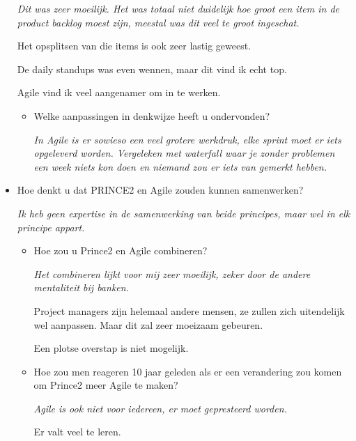 \documentclass[]{article}
\begin{document}
\begin{itemize}
	{\it 
		Dit was zeer moeilijk. Het was totaal niet duidelijk hoe groot een item in de product backlog moest zijn, meestal was dit veel te groot ingeschat.
		
		Het opsplitsen van die items is ook zeer lastig geweest.
		
		De daily standups was even wennen, maar dit vind ik echt top.
		
		Agile vind ik veel aangenamer om in te werken.
	}
	 
	\begin{itemize}
		\item Welke aanpassingen in denkwijze heeft u ondervonden?
		
		{\it 
			In Agile is er sowieso een veel grotere werkdruk, elke sprint moet er iets opgeleverd worden. Vergeleken met waterfall waar je zonder problemen een week niets kon doen en niemand zou er iets van gemerkt hebben.
		}
	\end{itemize}
	\item Hoe denkt u dat PRINCE2 en Agile zouden kunnen samenwerken?
	
	{\it 
		Ik heb geen expertise in de samenwerking van beide principes, maar wel in elk principe appart.
	}
	\begin{itemize}
		\item Hoe zou u Prince2 en Agile combineren?
		
		{\it 
			Het combineren lijkt voor mij zeer moeilijk, zeker door de andere mentaliteit bij banken. 
			
			Project managers zijn helemaal andere mensen, ze zullen zich uitendelijk wel aanpassen. Maar dit zal zeer moeizaam gebeuren.
			
			Een plotse overstap is niet mogelijk.
	}
		\item Hoe zou men reageren 10 jaar geleden als er een verandering zou komen om Prince2 meer Agile te maken?
		
		{\it 
			Agile is ook niet voor iedereen, er moet gepresteerd worden.
			
			Er valt veel te leren.
		}
	\end{itemize}
\end{itemize}
\end{document}

